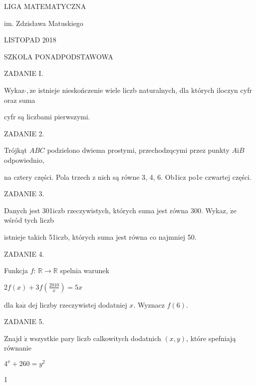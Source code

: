 \documentclass[a4paper,12pt]{article}
\begin{document}
LIGA MATEMATYCZNA

im. Zdzisława Matuskiego

LISTOPAD 2018

SZKOLA PONADPODSTAWOWA

ZADANIE I.

Wykaz$\cdot, \dot{\mathrm{z}}\mathrm{e}$ istnieje nieskończenie wiele liczb naturalnych, dla których iloczyn cyfr oraz suma

cyfr są liczbami pierwszymi.

ZADANIE 2.

Trójkąt $ABC$ podzielono dwiema prostymi, przechodzqcymi przez punkty $A\mathrm{i}B$ odpowiednio,

na cztery części. Pola trzech z nich są równe 3, 4, 6. Ob1icz po1e czwartej części.

ZADANIE 3.

Danych jest 301iczb rzeczywistych, których suma jest równa 300. Wykaz, $\dot{\mathrm{z}}\mathrm{e}$ wśród tych liczb

istnieje takich 51iczb, których suma jest równa co najmniej 50.

ZADANIE 4.

Funkcja $f$: $\mathbb{R}\rightarrow \mathbb{R}$ spelnia warunek

$2f(x)+3f(\displaystyle \frac{2010}{x})=5x$

dla $\mathrm{k}\mathrm{a}\dot{\mathrm{z}}$ dej liczby rzeczywistej dodatniej $x$. Wyznacz $f(6).$

ZADANIE 5.

Znajd $\acute{\mathrm{z}}$ wszystkie pary liczb calkowitych dodatnich $(x,y)$, które spefniają równanie

$4^{x}+260=y^{2}$

1
\end{document}
